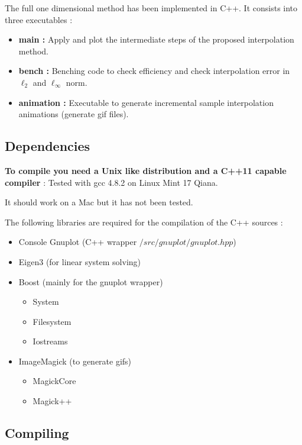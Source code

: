 The full one dimensional method has been implemented in C++. It consists into three executables :
\begin{itemize}
    \item \textbf{main :} Apply and plot the intermediate steps of the proposed interpolation method.
    \item \textbf{bench :} Benching code to check efficiency and check interpolation error in $\ell_2$ and $\ell_\infty$ norm.
    \item \textbf{animation :} Executable to generate incremental sample interpolation animations (generate gif files).
\end{itemize}

\subsection{Dependencies}

\textbf{To compile you need a Unix like distribution and a C++11 capable compiler} : Tested with gcc 4.8.2 on Linux Mint 17 Qiana.

\vskip 0.3cm
It should work on a Mac but it has not been tested.

\vskip 0.3cm
The following libraries are required for the compilation of the C++ sources :

\begin{itemize}
    \item Console Gnuplot (C++ wrapper $/src/gnuplot/gnuplot.hpp$) 
    \item Eigen3 (for linear system solving)
    \item Boost (mainly for the gnuplot wrapper)
        \begin{itemize}
                \item System 
                \item Filesystem 
                \item Iostreams
        \end{itemize}
    \item ImageMagick (to generate gifs)
        \begin{itemize}
            \item MagickCore 
            \item Magick++
        \end{itemize}
\end{itemize}

\subsection{Compiling}

